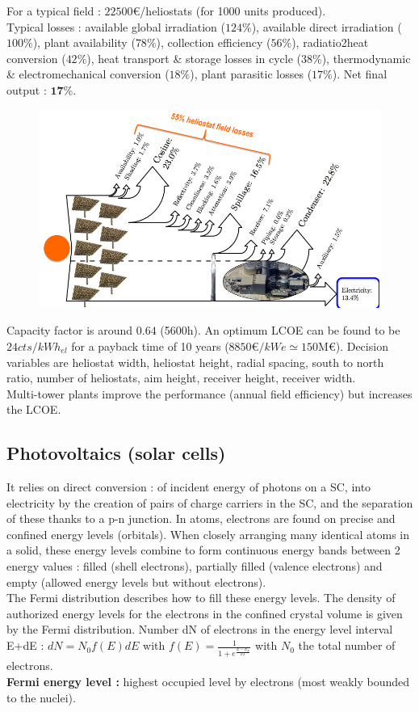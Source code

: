 \documentclass[../main.tex]{subfiles}
\begin{document}
For a typical field : $22500$€/heliostats (for 1000 units produced). \\
Typical losses : available global irradiation ($124\%$), available direct irradiation ($100\%$), plant availability ($78\%$), collection efficiency ($56\%$), radiatio2heat conversion ($42\%$), heat transport \& storage losses in cycle ($38\%$), thermodynamic \& electromechanical conversion ($18\%$), plant parasitic losses ($17\%$). Net final output : $\mathbf{17\%}$.\\

\begin{figure}[hbt!]
    \centering
    \includegraphics[width=0.7\linewidth]{IMAGES/Renewable/Screenshot from 2025-03-25 23-03-56.png}
\end{figure}
Capacity factor is around $0.64$ (5600h). An optimum LCOE can be found to be $24cts/kWh_{el}$ for a payback time of 10 years ($8850 $€$/kWe \simeq 150$M€). Decision variables are heliostat width, heliostat height, radial spacing, south to north ratio, number of heliostats, aim height, receiver height, receiver width.\\
Multi-tower plants improve the performance (annual field efficiency) but increases the LCOE.\\

\subsection{Photovoltaics (solar cells)}
It relies on direct conversion : of incident energy of photons on a SC, into electricity by the creation of pairs of charge carriers in the SC, and the separation of these thanks to a p-n junction. In atoms, electrons are found on precise and confined energy levels (orbitals). When closely arranging many identical atoms in a solid, these energy levels combine to form continuous energy bands between 2 energy values : filled (shell electrons), partially filled (valence electrons) and empty (allowed energy levels but without electrons).\\
The Fermi distribution describes how to fill these energy levels. The density of authorized energy levels for the electrons in the confined crystal volume is given by the Fermi distribution. Number dN of electrons in the energy level interval E+dE : $dN = N_0 f(E)dE$ with $f(E) = \frac{1}{1+e^{\frac{E-E_F}{kT}}}$ with $N_0$ the total number of electrons. \\
\textbf{Fermi energy level :} highest occupied level by electrons (most weakly bounded to the nuclei).\\
\end{document}
